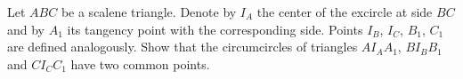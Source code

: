 \problem
Let $ABC$ be a scalene triangle.
Denote by $I_A$ the center of the excircle at side $BC$ and by $A_1$ its
tangency point with the corresponding side.
Points $I_B$, $I_C$, $B_1$, $C_1$ are defined analogously.
Show that the circumcircles of triangles $A I_A A_1$, $B I_B B_1$ and
$C I_C C_1$ have two common points.
\solution
\endproblem
